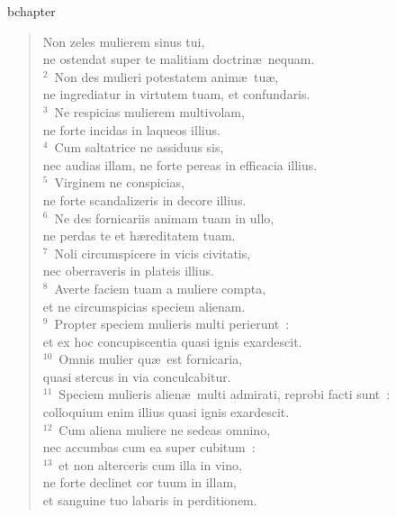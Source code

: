bchapter\begin{verse}\vspace{-19pt}Non zeles mulierem sinus tui,\\ ne ostendat super te malitiam doctrin\ae\ nequam.\\
${}^{2}$~Non des mulieri potestatem anim\ae\ tu\ae ,\\ ne ingrediatur in virtutem tuam, et confundaris.\\
${}^{3}$~Ne respicias mulierem multivolam,\\ ne forte incidas in laqueos illius.\\
${}^{4}$~Cum saltatrice ne assiduus sis,\\ nec audias illam, ne forte pereas in efficacia illius.\\
${}^{5}$~Virginem ne conspicias,\\ ne forte scandalizeris in decore illius.\\
${}^{6}$~Ne des fornicariis animam tuam in ullo,\\ ne perdas te et h\ae reditatem tuam.\\
${}^{7}$~Noli circumspicere in vicis civitatis,\\ nec oberraveris in plateis illius.\\
${}^{8}$~Averte faciem tuam a muliere compta,\\ et ne circumspicias speciem alienam.\\
${}^{9}$~Propter speciem mulieris multi perierunt~:\\ et ex hoc concupiscentia quasi ignis exardescit.\\
${}^{10}$~Omnis mulier qu\ae\ est fornicaria,\\ quasi stercus in via conculcabitur.\\
${}^{11}$~Speciem mulieris alien\ae\ multi admirati, reprobi facti sunt~:\\ colloquium enim illius quasi ignis exardescit.\\
${}^{12}$~Cum aliena muliere ne sedeas omnino,\\ nec accumbas cum ea super cubitum~:\\
${}^{13}$~et non alterceris cum illa in vino,\\ ne forte declinet cor tuum in illam,\\ et sanguine tuo labaris in perditionem.\end{verse}


